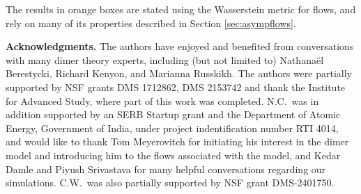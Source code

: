\documentclass[11pt]{article}
\theoremstyle{remark}
\theoremstyle{definition}
\newcommand{\mc}[1]{\mathcal{#1}}
\begin{document}
\normalsize


The results in orange boxes are stated using the Wasserstein metric for flows, and rely on many of its properties described in Section \ref{sec:asympflows}.

\bigskip
\noindent\textbf{Acknowledgments.} The authors have enjoyed and benefited from conversations with many dimer theory experts, including (but not limited to) Nathana\"el Berestycki, Richard Kenyon, and Marianna Russkikh. The authors were partially supported by NSF grants DMS 1712862, DMS 2153742 and thank the Institute for Advanced Study, where part of this work was completed. N.C.\ was in addition supported by an SERB Startup grant and the Department of Atomic Energy, Government of India, under project indentification number RTI 4014, and would like to thank Tom Meyerovitch for initiating his interest in the dimer model and introducing him to the flows associated with the model, and Kedar Damle and Piyush Srivastava for many helpful conversations regarding our simulations. C.W.\ was also partially supported by NSF grant DMS-2401750.
\end{document}
